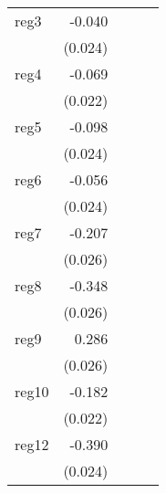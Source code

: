 {\begin{longtable}{l*{4}{D{.}{.}{-1}}}
\addlinespace
reg3        &      -0.040         &                     &                     &                     \\
            &     (0.024)         &                     &                     &                     \\
\addlinespace
reg4        &      -0.069\sym{**} &                     &                     &                     \\
            &     (0.022)         &                     &                     &                     \\
\addlinespace
reg5        &      -0.098\sym{***}&                     &                     &                     \\
            &     (0.024)         &                     &                     &                     \\
\addlinespace
reg6        &      -0.056\sym{*}  &                     &                     &                     \\
            &     (0.024)         &                     &                     &                     \\
\addlinespace
reg7        &      -0.207\sym{***}&                     &                     &                     \\
            &     (0.026)         &                     &                     &                     \\
\addlinespace
reg8        &      -0.348\sym{***}&                     &                     &                     \\
            &     (0.026)         &                     &                     &                     \\
\addlinespace
reg9        &       0.286\sym{***}&                     &                     &                     \\
            &     (0.026)         &                     &                     &                     \\
\addlinespace
reg10       &      -0.182\sym{***}&                     &                     &                     \\
            &     (0.022)         &                     &                     &                     \\
\addlinespace
reg12       &      -0.390\sym{***}&                     &                     &                     \\
            &     (0.024)         &                     &                     &                     \\

\end{longtable}}
